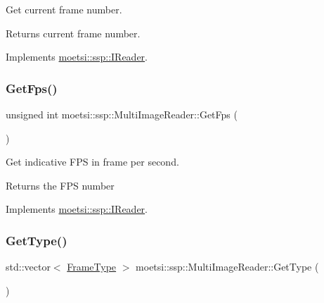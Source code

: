 Get current frame number. 

\begin{DoxyReturn}{Returns}
current frame number. 
\end{DoxyReturn}


Implements \hyperlink{classmoetsi_1_1ssp_1_1IReader_ac292d83eb06dee277baaa06e281a562d}{moetsi\+::ssp\+::\+I\+Reader}.

\mbox{\label{classmoetsi_1_1ssp_1_1MultiImageReader_ad0a249af66f8e1a063c3e575fc1b94cb}} 
\subsubsection{\texorpdfstring{Get\+Fps()}{GetFps()}}
{\footnotesize\ttfamily unsigned int moetsi\+::ssp\+::\+Multi\+Image\+Reader\+::\+Get\+Fps (\begin{DoxyParamCaption}{ }\end{DoxyParamCaption})\hspace{0.3cm}{\ttfamily [virtual]}}



Get indicative F\+PS in frame per second. 

\begin{DoxyReturn}{Returns}
the F\+PS number 
\end{DoxyReturn}


Implements \hyperlink{classmoetsi_1_1ssp_1_1IReader_a9f6a8650ca290b011b8e5451eeae9f32}{moetsi\+::ssp\+::\+I\+Reader}.

\mbox{\label{classmoetsi_1_1ssp_1_1MultiImageReader_ad5f6cf0cfb1e64bcf569ab0bbfcce9d6}} 
\subsubsection{\texorpdfstring{Get\+Type()}{GetType()}}
{\footnotesize\ttfamily std\+::vector$<$ \hyperlink{namespacemoetsi_1_1ssp_a46efdfa2cd5a28ead465dcc8006b5a87}{Frame\+Type} $>$ moetsi\+::ssp\+::\+Multi\+Image\+Reader\+::\+Get\+Type (\begin{DoxyParamCaption}{ }\end{DoxyParamCaption})\hspace{0.3cm}{\ttfamily [virtual]}}



